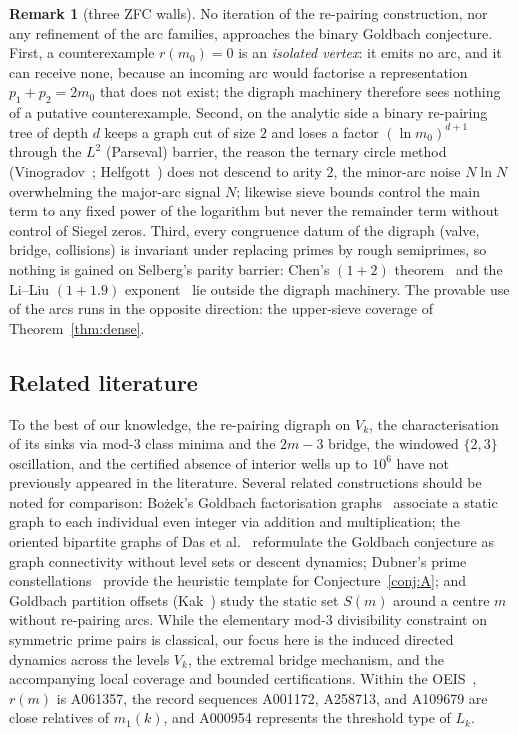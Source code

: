 \documentclass[11pt]{article}
\theoremstyle{plain}
\theoremstyle{definition}
\newtheorem{remark}[theorem]{Remark}
\newcommand{\rays}{S}
\newcommand{\rch}{r}
\newcommand{\Vk}{V_{k}}
\begin{document}
\begin{remark}[three ZFC walls]\label{rem:walls}
No iteration of the re-pairing construction, nor any refinement
of the arc families, approaches the binary Goldbach conjecture.
First, a counterexample $\rch(m_0) = 0$ is an \emph{isolated
vertex}: it emits no arc, and it can receive none, because an
incoming arc would factorise a representation $p_1 + p_2 = 2m_0$
that does not exist; the digraph machinery therefore sees nothing
of a putative counterexample. Second, on the analytic side a binary
re-pairing tree of depth $d$ keeps a graph cut of size $2$ and loses
a factor $(\ln m_0)^{d+1}$ through the $L^{2}$ (Parseval)
barrier, the reason the ternary circle method
(Vinogradov~\cite{vinogradov}; Helfgott~\cite{helfgott}) does not
descend to arity $2$, the minor-arc noise $N\ln N$ overwhelming the
major-arc signal $N$; likewise sieve bounds control the main term to
any fixed power of the logarithm but never the remainder term
without control of Siegel zeros. Third, every congruence datum of
the digraph (valve, bridge, collisions) is invariant under replacing
primes by rough semiprimes, so nothing is gained on Selberg's parity
barrier: Chen's $(1+2)$ theorem~\cite{chen} and the Li--Liu
$(1+1.9)$ exponent~\cite{liliu} lie outside the digraph machinery.
The provable use of the arcs runs in the opposite direction: the
upper-sieve coverage of Theorem~\ref{thm:dense}.
\end{remark}

\subsection{Related literature}

To the best of our knowledge, the re-pairing digraph on $\Vk$, the
characterisation of its sinks via mod-3 class minima and the
$2m-3$ bridge, the windowed $\{2,3\}$ oscillation, and the certified
absence of interior wells up to $10^6$ have not previously appeared
in the literature. Several related constructions should be noted for
comparison: Bo\.zek's Goldbach factorisation graphs~\cite{bozek}
associate a static graph to each individual even integer via
addition and multiplication; the oriented bipartite graphs of Das et
al.~\cite{das} reformulate the Goldbach conjecture as graph
connectivity without level sets or descent dynamics; Dubner's prime
constellations~\cite{dubner} provide the heuristic template for
Conjecture~\ref{conj:A}; and Goldbach partition offsets
(Kak~\cite{kak}) study the static set $\rays(m)$ around a centre $m$
without re-pairing arcs. While the elementary mod-3 divisibility
constraint on symmetric prime pairs is classical, our focus here is
the induced directed dynamics across the levels $\Vk$, the extremal
bridge mechanism, and the accompanying local coverage and bounded
certifications. Within the OEIS~\cite{oeis}, $\rch(m)$ is A061357,
the record sequences A001172, A258713, and A109679 are close
relatives of $m_1(k)$, and A000954 represents the threshold type of
$L_k$.
\end{document}
